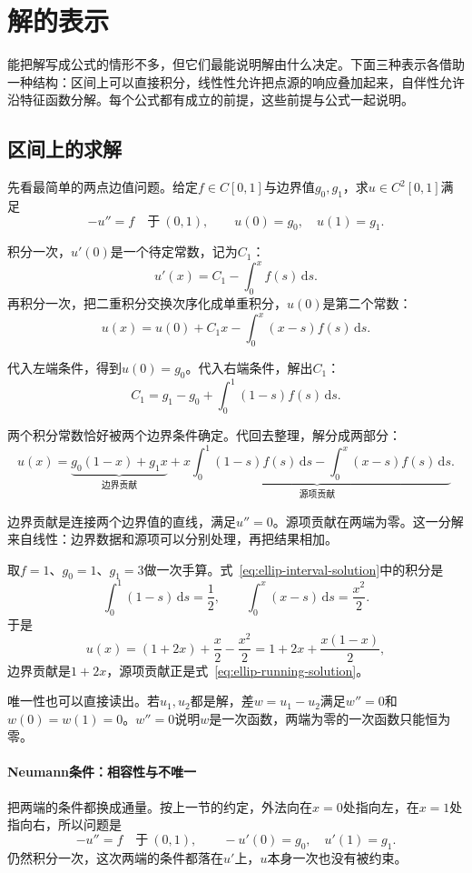 \section{解的表示}
\label{sec:ellip-representation}

能把解写成公式的情形不多，但它们最能说明解由什么决定。下面三种表示各借助一种结构：区间上可以直接积分，线性性允许把点源的响应叠加起来，自伴性允许沿特征函数分解。每个公式都有成立的前提，这些前提与公式一起说明。

\subsection{区间上的求解}
\label{sec:ellip-interval}

先看最简单的两点边值问题。给定$f\in C[0,1]$与边界值$g_0,g_1$，求$u\in C^2[0,1]$满足
\begin{equation}
 -u''=f\quad\text{于}\ (0,1),\qquad u(0)=g_0,\quad u(1)=g_1.
 \label{eq:ellip-interval-dirichlet}
\end{equation}

积分一次，$u'(0)$是一个待定常数，记为$C_1$：
\[
 u'(x)=C_1-\int_0^xf(s)\,\mathrm{d}s .
\]
再积分一次，把二重积分交换次序化成单重积分，$u(0)$是第二个常数：
\[
 u(x)=u(0)+C_1x-\int_0^x(x-s)f(s)\,\mathrm{d}s .
\]

代入左端条件，得到$u(0)=g_0$。代入右端条件，解出$C_1$：
\[
 C_1=g_1-g_0+\int_0^1(1-s)f(s)\,\mathrm{d}s .
\]

两个积分常数恰好被两个边界条件确定。代回去整理，解分成两部分：
\begin{equation}
 u(x)=\underbrace{g_0(1-x)+g_1x}_{\text{边界贡献}}
 +\underbrace{x\int_0^1(1-s)f(s)\,\mathrm{d}s-\int_0^x(x-s)f(s)\,\mathrm{d}s}_{\text{源项贡献}} .
 \label{eq:ellip-interval-solution}
\end{equation}

边界贡献是连接两个边界值的直线，满足$u''=0$。源项贡献在两端为零。这一分解来自线性：边界数据和源项可以分别处理，再把结果相加。

取$f=1$、$g_0=1$、$g_1=3$做一次手算。式~\eqref{eq:ellip-interval-solution}中的积分是
\[
 \int_0^1(1-s)\,\mathrm{d}s=\frac12,\qquad \int_0^x(x-s)\,\mathrm{d}s=\frac{x^2}2 .
\]
于是
\[
 u(x)=(1+2x)+\frac{x}{2}-\frac{x^2}{2}=1+2x+\frac{x(1-x)}{2},
\]
边界贡献是$1+2x$，源项贡献正是式~\eqref{eq:ellip-running-solution}。

唯一性也可以直接读出。若$u_1,u_2$都是解，差$w=u_1-u_2$满足$w''=0$和$w(0)=w(1)=0$。$w''=0$说明$w$是一次函数，两端为零的一次函数只能恒为零。

\paragraph{Neumann条件：相容性与不唯一}
把两端的条件都换成通量。按上一节的约定，外法向在$x=0$处指向左，在$x=1$处指向右，所以问题是
\begin{equation}
 -u''=f\quad\text{于}\ (0,1),\qquad -u'(0)=g_0,\quad u'(1)=g_1.
 \label{eq:ellip-interval-neumann}
\end{equation}
仍然积分一次，这次两端的条件都落在$u'$上，$u$本身一次也没有被约束。


